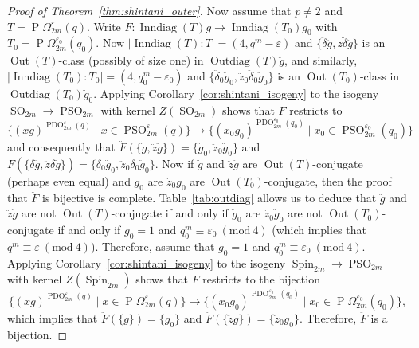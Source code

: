 \documentclass[11pt]{article}
\numberwithin{equation}{section}
\theoremstyle{shdefinition}
\theoremstyle{shplain}
\renewcommand{\d}{\delta}
\newcommand{\e}{\varepsilon}
\newcommand{\<}{\langle}
\renewcommand{\>}{\rangle}
\newcommand{\Out}{\operatorname{Out}}
\newcommand{\Inndiag}{\operatorname{Inndiag}}
\newcommand{\Outdiag}{\operatorname{Outdiag}}
\renewcommand{\:}{\colon}
\renewcommand{\mod}[1]{\mathrm{ \ } (\mathrm{mod\ } #1)}
\newcommand{\Om}{\Omega}
\newcommand{\SO}{\operatorname{SO}}
\newcommand{\POm}{\operatorname{P}\!\Om}
\newcommand{\PSO}{\operatorname{PSO}}
\newcommand{\PDO}{\operatorname{PDO}}
\newcommand{\Spin}{\operatorname{Spin}}
\begin{document}
\begin{proof}[Proof of Theorem~\ref{thm:shintani_outer}]
Now assume that $p \neq 2$ and $T = \POm^\e_{2m}(q)$. Write $F\:\Inndiag(T)g \to \Inndiag(T_0)g_0$ with $T_0 = \POm^{\e_0}_{2m}(q_0)$. Now $|\Inndiag(T):T| = (4,q^m-\e)$ and $\{\ddot{\d}\ddot{g}, \ddot{z}\ddot{\d}\ddot{g}\}$ is an $\Out(T)$-class (possibly of size one) in $\Outdiag(T)\ddot{g}$, and similarly, $|\Inndiag(T_0):T_0| = (4,q_0^m-\e_0)$ and $\{\ddot{\d}_0\ddot{g}_0, \ddot{z}_0\ddot{\d}_0\ddot{g}_0\}$ is an $\Out(T_0)$-class in $\Outdiag(T_0)\ddot{g}_0$. Applying Corollary~\ref{cor:shintani_isogeny} to the isogeny $\SO_{2m} \to \PSO_{2m}$ with kernel $Z(\SO_{2m})$ shows that $F$ restricts to
\[
\{ (xg)^{\PDO^\e_{2m}(q)} \mid x \in \PSO^\e_{2m}(q) \} \to \{ (x_0g_0)^{\PDO^{\e_0}_{2m}(q_0)} \mid x_0 \in \PSO^{\e_0}_{2m}(q_0) \}
\]
and consequently that $\ddot{F}(\{\ddot{g}, \ddot{z}\ddot{g}\}) = \{\ddot{g}_0, \ddot{z}_0\ddot{g}_0\}$ and $\ddot{F}(\{\ddot{\d}\ddot{g}, \ddot{z}\ddot{\d}\ddot{g}\}) = \{\ddot{\d}_0\ddot{g}_0, \ddot{z}_0\ddot{\d}_0\ddot{g}_0\}$. Now if $\ddot{g}$ and $\ddot{z}\ddot{g}$ are $\Out(T)$-conjugate (perhaps even equal) and $\ddot{g}_0$ are $\ddot{z}_0\ddot{g}_0$ are $\Out(T_0)$-conjugate, then the proof that $\ddot{F}$ is bijective is complete. Table~\ref{tab:outdiag} allows us to deduce that $\ddot{g}$ and $\ddot{z}\ddot{g}$ are not $\Out(T)$-conjugate if and only if $\ddot{g}_0$ are $\ddot{z}_0\ddot{g}_0$ are not $\Out(T_0)$-conjugate if and only if  $g_0 = 1$ and $q_0^m \equiv \e_0 \mod{4}$ (which implies that $q^m \equiv \e \mod{4}$). Therefore, assume that $g_0=1$ and $q_0^m \equiv \e_0 \mod{4}$. Applying Corollary~\ref{cor:shintani_isogeny} to the isogeny $\Spin_{2m} \to \PSO_{2m}$ with kernel $Z(\Spin_{2m})$ shows that $F$ restricts to the bijection
\[
\{ (xg)^{\PDO^\e_{2m}(q)} \mid x \in \POm^\e_{2m}(q) \} \to \{ (x_0g_0)^{\PDO^{\e_0}_{2m}(q_0)} \mid x_0 \in \POm^{\e_0}_{2m}(q_0) \},
\]
which implies that $\ddot{F}(\{\ddot{g}\}) = \{\ddot{g}_0\}$ and $\ddot{F}(\{\ddot{z}\ddot{g}\}) = \{\ddot{z}_0\ddot{g}_0\}$. Therefore, $\ddot{F}$ is a bijection.


\end{proof}
\end{document}
